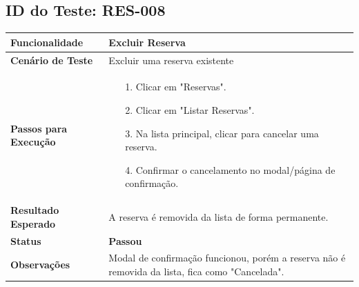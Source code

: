 \documentclass[
	12pt,				%
	openany,			%
	oneside,			%
	a4paper,			%
	english,			%
	french,				%
	spanish,			%
	brazil				%
	]{abntex2}
\begin{document}
\begin{apendicesenv}
\subsection*{ID do Teste: RES-008}
\begin{tabular}{@{} p{5cm} p{11cm} @{}}
	\toprule
	\textbf{Funcionalidade} & Excluir Reserva \\
	\midrule
	\textbf{Cenário de Teste} & Excluir uma reserva existente \\
	\midrule
	\textbf{Passos para Execução} &
	\begin{itemize} \itemsep0em 
		\item[1.] Clicar em "Reservas".
		\item[2.] Clicar em "Listar Reservas".
		\item[3.] Na lista principal, clicar para cancelar uma reserva.
		\item[4.] Confirmar o cancelamento no modal/página de confirmação.
	\end{itemize} \\
	\midrule
	\textbf{Resultado Esperado} & A reserva é removida da lista de forma permanente. \\
	\midrule
	\textbf{Status} & \textbf{Passou} \\
	\midrule
	\textbf{Observações} & Modal de confirmação funcionou, porém a reserva não é removida da lista, fica como "Cancelada". \\
	\bottomrule
\end{tabular}
\vspace{1cm}












\end{apendicesenv}








\printindex
\end{document}
